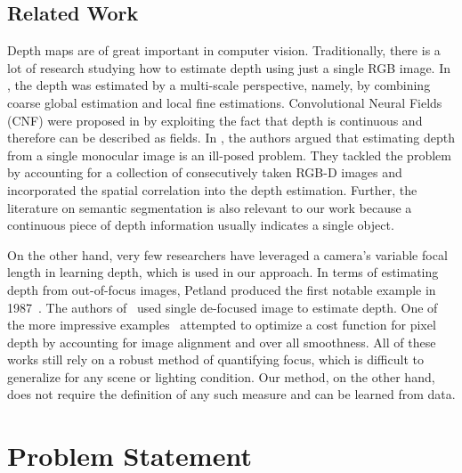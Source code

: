 \documentclass[letterpaper, 10 pt, conference]{ieeeconf}  %
\begin{document}
\subsection{Related Work}
Depth maps are of great important in computer vision. Traditionally, there is a lot of research studying how to estimate depth using just a single RGB image. In \cite{eigen2014depth}, the depth was estimated by a multi-scale perspective, namely, by combining coarse global estimation and local fine estimations. Convolutional Neural Fields (CNF) were proposed in \cite{liu2015learning} by exploiting the fact that depth is continuous and therefore can be described as fields. In \cite{choi2015depth}, the authors argued that estimating depth from a single monocular image is an ill-posed problem. They tackled the problem by accounting for a collection of consecutively taken RGB-D images and incorporated the spatial correlation into the depth estimation. Further, the literature on semantic segmentation \cite{long2015fully} is also relevant to our work because a continuous piece of depth information usually indicates a single object. 

On the other hand, very few researchers have leveraged a camera's variable focal length in learning depth, which is used in our approach. In terms of estimating depth from out-of-focus images, Petland produced the first notable example in 1987~\cite{pentland1987new}. The authors of~\cite{lin2013absolute} used single de-focused image to estimate depth. One of the more impressive examples~\cite{suwajanakorn2015depth} attempted to optimize a cost function for pixel depth by accounting for image alignment and over all smoothness. All of these works still rely on a robust method of quantifying focus, which is difficult to generalize for any scene or lighting condition. Our method, on the other hand, does not require the definition of any such measure and can be learned from data. 

\section{Problem Statement}
\label{sec:problemStatement}
\end{document}
